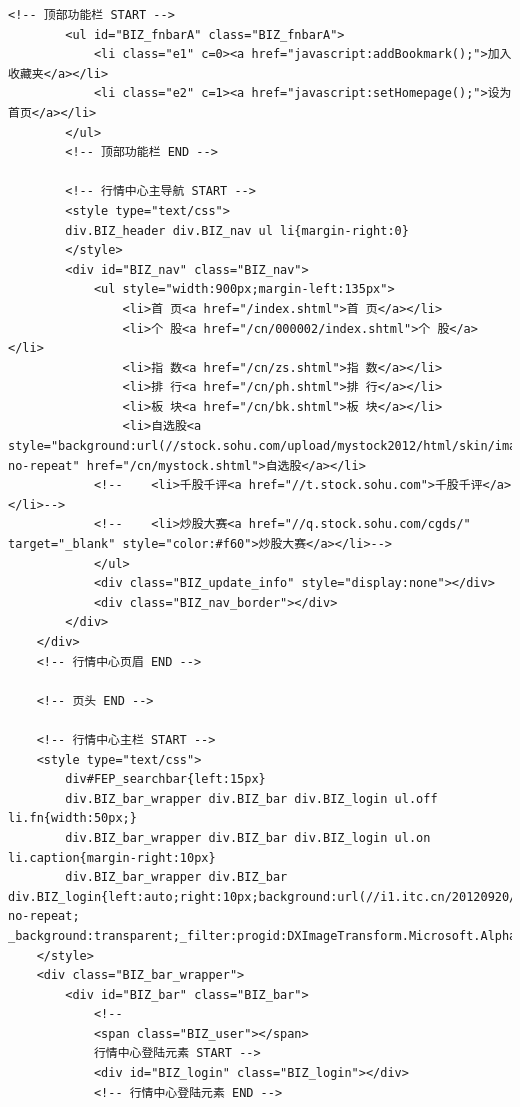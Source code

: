 \documentclass[UTF8,12pt]{article}
\begin{document}
\begin{lstlisting}[title=股票代码300117的界面html源码,frame=shadowbox]
        <!-- 顶部功能栏 START -->
        <ul id="BIZ_fnbarA" class="BIZ_fnbarA">
            <li class="e1" c=0><a href="javascript:addBookmark();">加入收藏夹</a></li>
            <li class="e2" c=1><a href="javascript:setHomepage();">设为首页</a></li>
        </ul>
        <!-- 顶部功能栏 END -->
    
        <!-- 行情中心主导航 START -->
        <style type="text/css">
        div.BIZ_header div.BIZ_nav ul li{margin-right:0}
        </style>
        <div id="BIZ_nav" class="BIZ_nav">
            <ul style="width:900px;margin-left:135px">
                <li>首 页<a href="/index.shtml">首 页</a></li>
                <li>个 股<a href="/cn/000002/index.shtml">个 股</a></li>
                <li>指 数<a href="/cn/zs.shtml">指 数</a></li>
                <li>排 行<a href="/cn/ph.shtml">排 行</a></li>
                <li>板 块<a href="/cn/bk.shtml">板 块</a></li>
                <li>自选股<a style="background:url(//stock.sohu.com/upload/mystock2012/html/skin/images/new2.gif) no-repeat" href="/cn/mystock.shtml">自选股</a></li>
            <!--	<li>千股千评<a href="//t.stock.sohu.com">千股千评</a></li>-->
            <!--	<li>炒股大赛<a href="//q.stock.sohu.com/cgds/" target="_blank" style="color:#f60">炒股大赛</a></li>-->
            </ul>
            <div class="BIZ_update_info" style="display:none"></div>
            <div class="BIZ_nav_border"></div>
        </div>
    </div>
    <!-- 行情中心页眉 END -->
    
    <!-- 页头 END -->
    
    <!-- 行情中心主栏 START -->
    <style type="text/css">
        div#FEP_searchbar{left:15px}
        div.BIZ_bar_wrapper div.BIZ_bar div.BIZ_login ul.off li.fn{width:50px;}
        div.BIZ_bar_wrapper div.BIZ_bar div.BIZ_login ul.on li.caption{margin-right:10px}
        div.BIZ_bar_wrapper div.BIZ_bar div.BIZ_login{left:auto;right:10px;background:url(//i1.itc.cn/20120920/2bb1_e4c60ac2_b96d_b596_71aa_d67fed8c8861_1.png) no-repeat; _background:transparent;_filter:progid:DXImageTransform.Microsoft.AlphaImageLoader(enabled='true',sizingMethod='crop',src='//i1.itc.cn/20120920/2bb1_e4c60ac2_b96d_b596_71aa_d67fed8c8861_1.png')}
    </style>
    <div class="BIZ_bar_wrapper">
        <div id="BIZ_bar" class="BIZ_bar">
            <!--
            <span class="BIZ_user"></span>
            行情中心登陆元素 START -->
            <div id="BIZ_login" class="BIZ_login"></div>
            <!-- 行情中心登陆元素 END -->
            

\end{lstlisting}
\end{document}
